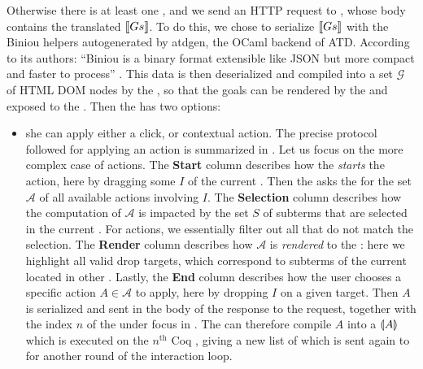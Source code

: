 Otherwise there is at least one , and we send an  HTTP
request to , whose body contains the translated  $\llbracket Gs \rrbracket$. To
do this, we chose to serialize $\llbracket Gs \rrbracket$ with the Biniou helpers
autogenerated by atdgen, the OCaml backend of ATD. According to its authors:
``Biniou is a binary format extensible like JSON but more compact and faster to
process'' . This data is then deserialized and compiled into a
set $\mathcal{G}$ of HTML DOM nodes by the , so that the goals
can be rendered by the  and exposed to the .
Then the  has two options:
\begin{itemize}
  \item she can apply either a click,  or contextual action. The precise protocol followed for applying an action is
  summarized in . Let us focus on the more complex case
  of  actions. The \textbf{Start} column describes how the 
  \emph{starts} the action, here by dragging some  $I$ of the current
  . Then the  asks the  for the set
  $\mathcal{A}$ of all available  actions involving $I$. The
  \textbf{Selection} column describes how the computation of $\mathcal{A}$ is
  impacted by the set $S$ of subterms that are selected in the current .
  For  actions, we essentially filter out all  that do not match the
  selection. The \textbf{Render} column describes how $\mathcal{A}$ is
  \emph{rendered} to the : here we highlight all valid drop
  targets, which correspond to subterms of the current  located in other
  . Lastly, the \textbf{End} column describes how
  the user chooses a specific action $A \in \mathcal{A}$ to apply, here by
  dropping $I$ on a given target. Then $A$ is serialized and sent in the body of
  the response to the  request, together with the index $n$ of
  the  under focus in . The  can therefore compile
  $A$ into a  $\llparenthesis A \rrparenthesis$ which is executed on the $n^{\text{th}}$ Coq
  , giving a new list of  which is sent again to  for
  another round of the interaction loop.


\end{itemize}
